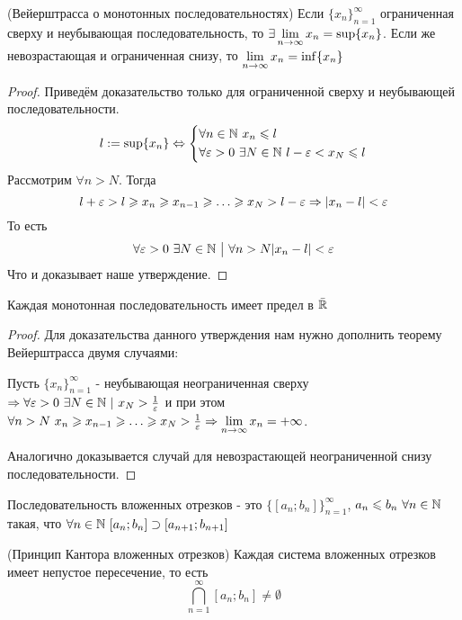 \begin{theorem} (Вейерштрасса о монотонных последовательностях)
	Если $\{x_n\}_{n = 1}^\infty$ ограниченная сверху и неубывающая последовательность, то $\exists \lim\limits_{n \rightarrow \infty} x_n = \sup \{x_n\}$. Если же невозрастающая и ограниченная снизу, то $\lim\limits_{n \rightarrow \infty} x_n = \inf \{x_n\}$
\end{theorem}

\begin{proof}
	Приведём доказательство только для ограниченной сверху и неубывающей последовательности.
	\[
		l := \sup \{x_n\} \Leftrightarrow \left\{\begin{aligned}
		&\forall n \in \mathbb{N}\ x_n \leqslant l
		\\
		&\forall \varepsilon > 0\ \exists N \in \mathbb{N}\ l - \varepsilon < x_N \leqslant l
		\end{aligned}\right.
	\]
	Рассмотрим $\forall n > N$. Тогда
	\[
		l + \eps > l \ge x_n \ge x_{n - 1} \ge \dots \ge x_N > l - \eps \Ra |x_n - l| < \eps
	\]
	То есть
	\[
		\forall \varepsilon > 0\ \exists N \in \mathbb{N} \ \big|\  \forall n > N |x_n - l| < \varepsilon
	\]
	Что и доказывает наше утверждение.
\end{proof}

\begin{proposition}
	Каждая монотонная последовательность имеет предел в $\bar{\mathbb{R}}$
\end{proposition}

\begin{proof}
	Для доказательства данного утверждения нам нужно дополнить теорему Вейерштрасса двумя случаями:
	
	Пусть $\{x_n\}_{n = 1}^\infty$ - неубывающая неограниченная сверху $\Rightarrow \forall \varepsilon > 0\ \exists N \in \mathbb{N}\ |\ x_N > \frac{1}{\varepsilon}$ и при этом $\forall n > N\ x_n \ge x_{n - 1} \ge \dots \ge x_N > \frac{1}{\eps} \Ra \liml_{n \to \infty} x_n = +\infty$.

	Аналогично доказывается случай для невозрастающей неограниченной снизу последовательности.
\end{proof}

\begin{definition}
	Последовательность вложенных отрезков - это $\{[a_n; b_n]\}_{n = 1}^\infty$, $a_n \leqslant b_n\ \forall n \in \mathbb{N}$ такая, что $\forall n \in \mathbb{N}\ [a_n; b_n] \supset [a_{n + 1}; b_{n + 1}]$
\end{definition}

\begin{theorem} (Принцип Кантора вложенных отрезков)
	Каждая система вложенных отрезков имеет непустое пересечение, то есть
	\[
		\bigcap\limits_{n = 1}^\infty [a_n; b_n] \neq \emptyset
	\]
\end{theorem}

